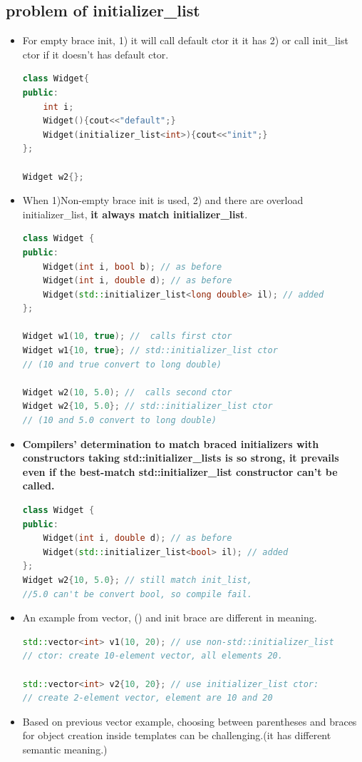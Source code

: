 \documentclass[a4paper,11pt,twoside]{book}
\begin{document}
\subsection{problem of initializer\_list}
	
\begin{itemize}

\item For empty brace init, 1) it will call default ctor it it has 2) or call init\_list ctor if it doesn't has default ctor. 

\begin{lstlisting}[frame=single, language=c++,mathescape=true]
class Widget{
public:
	int i;
	Widget(){cout<<"default";}
	Widget(initializer_list<int>){cout<<"init";}
};

Widget w2{}; 
\end{lstlisting}

	\item When 1)Non-empty brace init is used, 2) and there are overload initializer\_list, \textbf{it always match initializer\_list}.
\begin{lstlisting}[frame=single, language=c++,mathescape=true]
class Widget {
public:
	Widget(int i, bool b); // as before
	Widget(int i, double d); // as before
	Widget(std::initializer_list<long double> il); // added
};
	
Widget w1(10, true); //  calls first ctor
Widget w1{10, true}; // std::initializer_list ctor
// (10 and true convert to long double)

Widget w2(10, 5.0); //  calls second ctor
Widget w2{10, 5.0}; // std::initializer_list ctor
// (10 and 5.0 convert to long double)
\end{lstlisting}
	
	\item \textbf{ Compilers' determination to match braced initializers with constructors taking std::initializer\_lists is so strong, it prevails even if the best-match std::initializer\_list constructor can't be called.}
\begin{lstlisting}[frame=single, language=c++,mathescape=true]
class Widget {
public:
	Widget(int i, double d); // as before
	Widget(std::initializer_list<bool> il); // added
};
Widget w2{10, 5.0}; // still match init_list,
//5.0 can't be convert bool, so compile fail.
\end{lstlisting}
	
	\item An example from vector, () and init brace are different in meaning.
\begin{lstlisting}[frame=single, language=c++,mathescape=true]
std::vector<int> v1(10, 20); // use non-std::initializer_list
// ctor: create 10-element vector, all elements 20.
	
std::vector<int> v2{10, 20}; // use initializer_list ctor:
// create 2-element vector, element are 10 and 20
\end{lstlisting}
	
	\item Based on previous vector example, choosing between parentheses and braces for object creation inside templates can be challenging.(it has different semantic meaning.)
\end{itemize}
\end{document}
